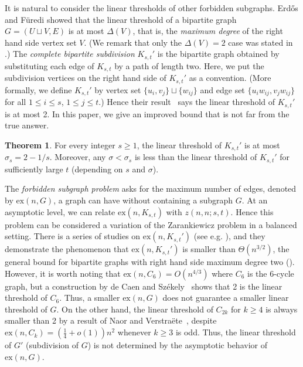 \documentclass[11pt]{article}
\theoremstyle{definition}
\newtheorem{theorem}{Theorem}[section]
\begin{document}
It is natural to consider the linear thresholds of other forbidden subgraphs. Erd\H{o}s and F\"uredi \cite{furedi1991turan} showed that the linear threshold of a bipartite graph $G = (U \sqcup V, E)$ is at most $\Delta(V)$, that is, the \textit{maximum degree} of the right hand side vertex set $V$. (We remark that only the $\Delta(V) = 2$ case was stated in \cite{furedi1991turan}.) The \textit{complete bipartite subdivision} $K_{s,t}'$ is the bipartite graph obtained by substituting each edge of $K_{s,t}$ by a path of length two. Here, we put the subdivision vertices on the right hand side of $K_{s,t}'$ as a convention. (More formally, we define $K_{s,t}'$ by vertex set $\{u_i,v_j\} \sqcup \{w_{ij}\}$ and edge set $\{u_iw_{ij}, v_jw_{ij}\}$ for all $1\leq i\leq s$, $1\leq j\leq t$.) Hence their result~\cite{furedi1991turan} says the linear threshold of $K_{s,t}'$ is at most 2. In this paper, we give an improved bound that is not far from the true answer.

\begin{theorem}\label{main}
    For every integer $s \geq 1$, the linear threshold of $K_{s,t}'$ is at most $\sigma_s = 2 - 1/s$. Moreover, any $\sigma < \sigma_s$ is less than the linear threshold of $K_{s,t}'$ for sufficiently large $t$ (depending on $s$ and $\sigma$).
\end{theorem}

The \textit{forbidden subgraph problem} asks for the maximum number of edges, denoted by $\text{ex}(n, G)$, a graph can have without containing a subgraph $G$. At an asymptotic level, we can relate $\text{ex}(n,K_{s,t})$ with $z(n,n;s,t)$. Hence this problem can be considered a variation of the Zarankiewicz problem in a balanced setting. There is a series of studies on $\text{ex}(n,K_{s,t}')$ (see e.g. \cite{janzer2019improved,sudakov2020turan,conlon2021more,conlon2021extremal,kang2021rational}), and they demonstrate the phenomenon that $\text{ex}(n, K_{s,t}')$ is smaller than $\Theta(n^{3/2})$, the general bound for bipartite graphs with right hand side maximum degree two (\cite{furedi1991turan,alon2003turan}). However, it is worth noting that $\text{ex}(n, C_6) = O(n^{4/3})$ where $C_6$ is the $6$-cycle graph, but a construction by de Caen and Sz\'ekely~\cite{de1991maximum} shows that 2 is the linear threshold of $C_6$. Thus, a smaller $\text{ex}(n, G)$ does not guarantee a smaller linear threshold of $G$. On the other hand, the linear threshold of $C_{2k}$ for $k \geq 4$ is always smaller than 2 by a result of Naor and Verstra\"ete~\cite{naor2005note}, despite $\text{ex}(n, C_k) = (\frac{1}{4} + o(1))n^2$ whenever $k \geq 3$ is odd. Thus, the linear threshold of $G'$ (subdivision of $G$) is not determined by the asymptotic behavior of $\text{ex}(n,G)$.
\end{document}
